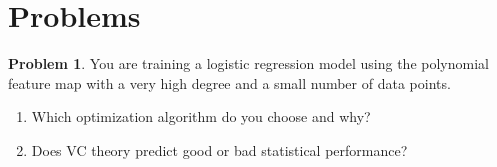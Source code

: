 \documentclass[10pt]{exam}
\theoremstyle{definition}
\newtheorem{problem}{Problem}
\newcommand{\ignore}[1]{}
\begin{document}
\ignore{
\section*{Section 2.1, 2.2}
    Reproduce the update formulas for \emph{gradient descent} (GD) and \emph{stochastic gradient descent} (SGD) below.
    This is Equations (2-5) in the reference.

\section*{Section 3.1}

Equation (6) states that the excess error $\mathcal E = E(\tilde f_n) - E(f^*)$ can be decomposed in three terms:
\begin{align*}
    \mathcal E 
    & = \bigg(E(f^*_{\mathcal F}) - E(f^*)\bigg)
      + \bigg(E(f_n) - E(f^*_{\mathcal F})\bigg)
      + \bigg(E(\tilde f_n) - E(f_n)\bigg)
\end{align*}

\section*{Section 3.2}
}

\newpage
\section*{Problems}

\begin{problem}
    You are training a logistic regression model using the polynomial feature map with a very high degree and a small number of data points.
    \begin{enumerate}
        \item
            Which optimization algorithm do you choose and why?
            \vspace{4in}
        \item
            Does VC theory predict good or bad statistical performance?
    \end{enumerate}
\end{problem}
\end{document}
